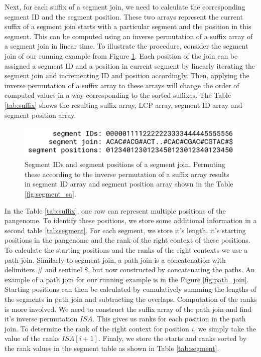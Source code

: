 Next, for each suffix of a segment join, we need to calculate the corresponding
segment ID and the segment position.
These two arrays represent the current suffix of a segment join starts with a
particular segment and the position in this segment.
This can be computed using an inverse permutation of a suffix array of a segment
join in linear time.
To illustrate the procedure, consider the segment join of our running example from
Figure \ref{fig:ids_and_positions}.
Each position of the join can be assigned a segment ID and a position in current
segment by linearly iterating the segment join and incrementing ID and position
accordingly.
Then, applying the inverse permutation of a suffix array to these arrays will
change the order of computed values in a way corresponding to the sorted suffixes.
The Table \ref{tab:suffix} shows the resulting suffix array, LCP array,
segment ID array and segment position array.

\begin{figure}
    \centering
    \includegraphics[width=\linewidth]{images/ids_and_positions.png}
    \caption{
        Segment IDs and segment positions of a segment join. Permuting these
        according to the inverse permutation of a suffix array results in 
        segment ID array and segment position array shown in the Table \ref{fig:segment_sa}.
    }
    \label{fig:ids_and_positions}
\end{figure}



In the Table \ref{tab:suffix}, one row can represent multiple positions of the
pangenome.
To identify these positions, we store some additional information in a second
table \ref{tab:segment}.
For each segment, we store it's length, it's starting positions in the pangenome
and the rank of the right context of these positions.
To calculate the starting positions and the ranks of the right contexts we use
a path join.
Similarly to segment join, a path join is a concatenation with delimiters $\#$
and sentinel $\$$, but now constructed by concatenating the paths.
An example of a path join for our running example is in the Figure \ref{fig:path_join}.
Starting positions can then be calculated by cumulatively summing the lengths
of the segments in path join and subtracting the overlaps.
Computation of the ranks is more involved.
We need to construct the suffix array of the path join and find it's inverse
permutation $ISA$.
This gives us ranks for each position in the path join.
To determine the rank of the right context for position $i$, we simply take
the value of the ranks $ISA[i+1]$.
Finaly, we store the starts and ranks sorted by the rank values in the segment
table as shown in Table \ref{tab:segment}.


